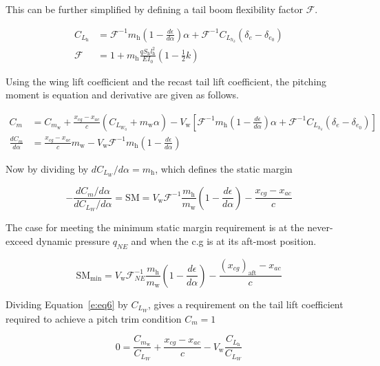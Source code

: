 This can be further simplified by defining a tail boom flexibility factor $\mathcal{F}$.

\begin{align}
    C_{L_{\text{h}}} &= \mathcal{F}^{-1} m_{\text{h}} \left( 1 - \frac{d\epsilon}{d\alpha}\right) \alpha + \mathcal{F}^{-1} C_{L_{h_{\delta}}}(\delta_e - \delta_{e_0}) \\
    \mathcal{F} &= 1 + m_{\text{h}} \frac{qS_{\text{h}}l_{\text{h}}^2}{EI_0}(1-\frac{1}{2}k) 
\end{align}

Using the wing lift coefficient and the recast tail lift coefficient, the pitching moment is equation and derivative are given as follows.

\begin{align}
    C_m &= C_{m_{\text{w}}} + \frac{x_{cg} - x_{ac}}{c} (C_{L_{W_0}} + m_{\text{w}} \alpha) - V_{\text{w}} \left[ \mathcal{F}^{-1} m_{\text{h}} \left( 1 - \frac{d\epsilon}{d\alpha}\right) \alpha + \mathcal{F}^{-1} C_{L_{h_{\delta}}}(\delta_e - \delta_{e_0})\right] \\
    \frac{dC_m}{d\alpha} & = \frac{x_{cg} - x_{ac}}{c} m_{\text{w}}  - V_{\text{w}} \mathcal{F}^{-1} m_{\text{h}} \left( 1 - \frac{d\epsilon}{d\alpha}\right) 
\end{align}

Now by dividing by $dC_{L_W}/d\alpha = m_{\text{h}}$, which defines the static margin

\begin{equation}
    -\frac{dC_m/d\alpha}{dC_{L_W}/d\alpha} = \text{SM} = V_{\text{w}} \mathcal{F}^{-1} \frac{m_{\text{h}}}{m_{\text{w}}} \left( 1 - \frac{d\epsilon}{d\alpha}\right) - \frac{x_{cg} - x_{ac}}{c}
\end{equation}

The case for meeting the minimum static margin requirement is at the never-exceed dynamic pressure $q_{NE}$ and when the c.g is at its aft-most position.

\begin{equation}
    \text{SM}_{\text{min}} = V_{\text{w}} \mathcal{F}_{NE}^{-1} \frac{m_{\text{h}}}{m_{\text{w}}} \left( 1 - \frac{d\epsilon}{d\alpha}\right) - \frac{(x_{cg})_{\text{aft}} - x_{ac}}{c} 
\end{equation}

Dividing Equation~\eqref{e:eq6} by $C_{L_W}$, gives a requirement on the tail lift coefficient required to achieve a pitch trim condition $C_m=1$

\begin{equation}
    0 = \frac{C_{m_{\text{w}}}}{C_{L_W}} + \frac{x_{cg} - x_{ac}}{c} - V_{\text{w}} \frac{C_{L_{\text{h}}}}{C_{L_W}}
\end{equation}

